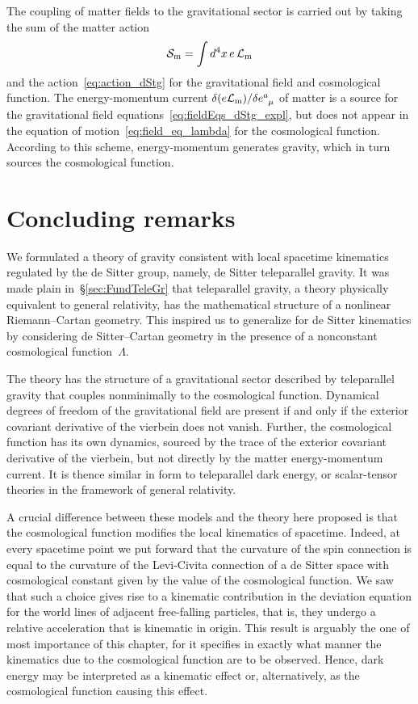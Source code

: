 \documentclass[
final,
11pt,
a4paper,
DIV=11,
headinclude=true,
footinclude=false,
bibliography=totoc,
twoside=true,  %
BCOR=5mm
]{scrbook}
\begin{document}
The coupling of matter fields to the gravitational sector is 
carried out by taking the sum of the matter action
\begin{equation*}
  \mathcal{S}_\mathrm{m} = \int d^4x \, e \, \mathcal{L}_\mathrm{m}
\end{equation*}
and the action~\eqref{eq:action_dStg} for the gravitational field 
and cosmological function. The energy-momentum current $\delta (e 
\mc{L}_\mrm{m})/\delta e\ind{^a_\mu}$ of matter is a source for 
the gravitational field equations~\eqref{eq:fieldEqs_dStg_expl}, 
but does not appear in the equation of 
motion~\eqref{eq:field_eq_lambda} for the cosmological function.  
According to this scheme, energy-momentum generates gravity, 
which in turn sources the cosmological function.

\section{Concluding remarks}
  
We formulated a theory of gravity consistent with local spacetime 
kinematics regulated by the de Sitter group, namely, de Sitter 
teleparallel gravity. It was made plain in~\S\ref{sec:FundTeleGr} 
that teleparallel gravity, a theory physically equivalent to 
general relativity, has the mathematical structure of a nonlinear 
Riemann--Cartan geometry. This inspired us to generalize for de 
Sitter kinematics by considering de Sitter--Cartan geometry in 
the presence of a nonconstant cosmological function~$\Lambda$. 

The theory has the structure of a gravitational sector described 
by teleparallel gravity that couples nonminimally to the 
cosmological function. Dynamical degrees of freedom of the 
gravitational field are present if and only if the exterior 
covariant derivative of the vierbein does not vanish.  Further, 
the cosmological function has its own dynamics, sourced by the 
trace of the exterior covariant derivative of the vierbein, but 
not directly by the matter energy-momentum current.  It is thence 
similar in form to teleparallel dark energy, or scalar-tensor 
theories in the framework of general relativity.

A crucial difference between these models and the theory here 
proposed is that the cosmological function modifies the local 
kinematics of spacetime. Indeed, at every spacetime point we put 
forward that the curvature of the spin connection is equal to the 
curvature of the Levi-Civita connection of a de Sitter space with 
cosmological constant given by the value of the cosmological 
function. We saw that such a choice gives rise to a kinematic 
contribution in the deviation equation for the world lines of 
adjacent free-falling particles, that is, they undergo a relative 
acceleration that is kinematic in origin. This result is arguably 
the one of most importance of this chapter, for it specifies in 
exactly what manner the kinematics due to the cosmological 
function are to be observed.  Hence, dark energy may be 
interpreted as a kinematic effect or, alternatively, as the 
cosmological function causing this effect.
\end{document}
